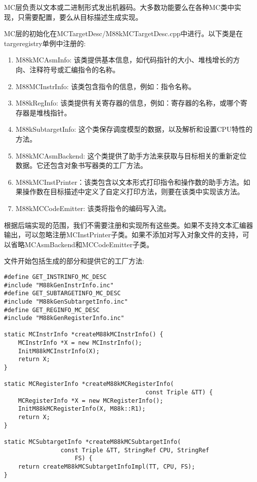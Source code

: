 MC层负责以文本或二进制形式发出机器码。大多数功能要么在各种MC类中实现，只需要配置，要么从目标描述生成实现。\par

MC层的初始化在MCTargetDesc/M88kMCTargetDesc.cpp中进行。以下类是在targeregistry单例中注册的:\par

\begin{enumerate}
\item M88kMCAsmInfo: 该类提供基本信息，如代码指针的大小、堆栈增长的方向、注释符号或汇编指令的名称。

\item M88MCInstrInfo: 该类包含指令的信息，例如：指令名称。

\item M88kRegInfo: 该类提供有关寄存器的信息，例如：寄存器的名称，或哪个寄存器是堆栈指针。

\item M88kSubtargetInfo: 这个类保存调度模型的数据，以及解析和设置CPU特性的方法。

\item M88kMCAsmBackend: 这个类提供了助手方法来获取与目标相关的重新定位数据。它还包含对象书写器类的工厂方法。

\item M88kMCInstPrinter：该类包含以文本形式打印指令和操作数的助手方法。如果操作数在目标描述中定义了自定义打印方法，则要在该类中实现该方法。

\item M88kMCCodeEmitter: 该类将指令的编码写入流。
\end{enumerate}

根据后端实现的范围，我们不需要注册和实现所有这些类。如果不支持文本汇编器输出，可以忽略注册MCInstPrinter子类。如果不添加对写入对象文件的支持，可以省略MCAsmBackend和MCCodeEmitter子类。\par
 
文件开始包括生成的部分和提供它的工厂方法:\par

\begin{lstlisting}[caption={}]
#define GET_INSTRINFO_MC_DESC
#include "M88kGenInstrInfo.inc"
#define GET_SUBTARGETINFO_MC_DESC
#include "M88kGenSubtargetInfo.inc"
#define GET_REGINFO_MC_DESC
#include "M88kGenRegisterInfo.inc"

static MCInstrInfo *createM88kMCInstrInfo() {
	MCInstrInfo *X = new MCInstrInfo();
	InitM88kMCInstrInfo(X);
	return X;
}

static MCRegisterInfo *createM88kMCRegisterInfo(
										const Triple &TT) {
	MCRegisterInfo *X = new MCRegisterInfo();
	InitM88kMCRegisterInfo(X, M88k::R1);
	return X;
}

static MCSubtargetInfo *createM88kMCSubtargetInfo(
				const Triple &TT, StringRef CPU, StringRef
					FS) {
	return createM88kMCSubtargetInfoImpl(TT, CPU, FS);
}
\end{lstlisting}

